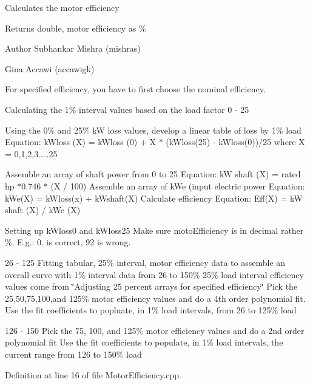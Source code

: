Calculates the motor efficiency

\begin{DoxyReturn}{Returns}
double, motor efficiency as \%
\end{DoxyReturn}
\begin{DoxyAuthor}{Author}
Subhankar Mishra (mishras) 

Gina Accawi (accawigk) 
\end{DoxyAuthor}
For specified efficiency, you have to first choose the nominal efficiency.

Calculating the 1\% interval values based on the load factor 0 -\/ 25
\begin{DoxyEnumerate}
\item Using the 0\% and 25\% kW loss values, develop a linear table of loss by 1\% load Equation\+: k\+Wloss (X) = k\+Wloss (0) + X $\ast$ (k\+Wloss(25) -\/ k\+Wloss(0))/25 where X = 0,1,2,3…..25
\item Assemble an array of shaft power from 0 to 25 Equation\+: kW shaft (X) = rated hp $\ast$0.746 $\ast$ (X / 100) Assemble an array of k\+We (input electric power Equation\+: k\+We(\+X) = k\+Wloss(x) + k\+Wshaft(\+X) Calculate efficiency Equation\+: Eff(\+X) = kW shaft (X) / k\+We (X)
\end{DoxyEnumerate}

Setting up k\+Wloss0 and k\+Wloss25 Make sure moto\+Efficiency is in decimal rather \%. E.\+g.\+: 0. is correct, 92 is wrong.

26 -\/ 125 Fitting tabular, 25\% interval, motor efficiency data to assemble an overall curve with 1\% interval data from 26 to 150\% 25\% load interval efficiency values come from \char`\"{}\+Adjusting 25 percent arrays for specified efficiency\char`\"{} Pick the 25,50,75,100,and 125\% motor efficiency values and do a 4th order polynomial fit. Use the fit coefficients to popluate, in 1\% load intervals, from 26 to 125\% load

126 -\/ 150 Pick the 75, 100, and 125\% motor efficiency values and do a 2nd order polynomial fit Use the fit coefficients to populate, in 1\% load intervals, the current range from 126 to 150\% load

Definition at line 16 of file Motor\+Efficiency.\+cpp.

\mbox{\label{class_motor_efficiency_a448092c19177f5fff0c011f0c9398db0}} 
